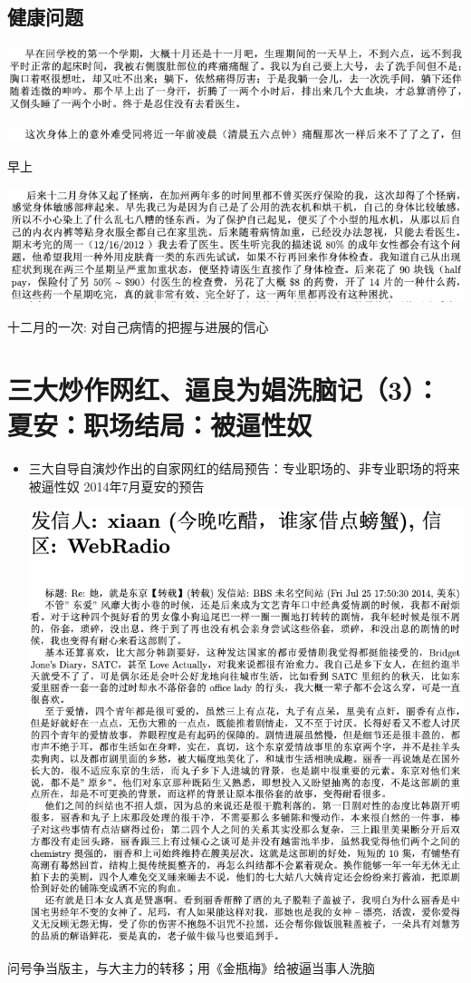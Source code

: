 \documentclass[9pt, b5paper]{article}
\begin{document}
\subsection{健康问题}
\label{sec:org53cd542}
\begin{center}
\includegraphics[width=.9\linewidth]{./pic/backups_plans_20210424_212545.png}
\end{center}
\begin{center}
\includegraphics[width=.9\linewidth]{./pic/backups_plans_20210424_220817.png}
\end{center}
早上
\begin{center}
\includegraphics[width=.9\linewidth]{./pic/backups_plans_20210424_212910.png}
\end{center}
十二月的一次: 对自己病情的把握与进展的信心

\section{三大炒作网红、逼良为娼洗脑记（3）：夏安：职场结局：被逼性奴}
\label{sec:orgf3a8e74}
\begin{itemize}
\item 三大自导自演炒作出的自家网红的结局预告：专业职场的、非专业职场的将来被逼性奴 2014年7月夏安的预告
\begin{center}
\includegraphics[width=.9\linewidth]{./pic/p2p201.png}
\end{center}
\end{itemize}
问号争当版主，与大主力的转移；用《金瓶梅》给被逼当事人洗脑
\end{document}
